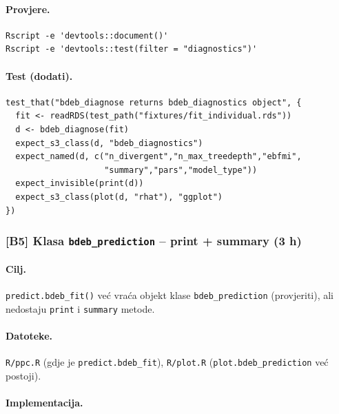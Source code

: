 \documentclass[11pt,a4paper]{article}
\newcommand{\file}[1]{\texttt{\small #1}}
\newcommand{\fn}[1]{\texttt{\small #1()}}
\newcommand{\code}[1]{\texttt{\small #1}}
\begin{document}
\paragraph{Provjere.}
\begin{lstlisting}[style=Shellstyle]
Rscript -e 'devtools::document()'
Rscript -e 'devtools::test(filter = "diagnostics")'
\end{lstlisting}

\paragraph{Test (dodati).}
\begin{lstlisting}
test_that("bdeb_diagnose returns bdeb_diagnostics object", {
  fit <- readRDS(test_path("fixtures/fit_individual.rds"))
  d <- bdeb_diagnose(fit)
  expect_s3_class(d, "bdeb_diagnostics")
  expect_named(d, c("n_divergent","n_max_treedepth","ebfmi",
                    "summary","pars","model_type"))
  expect_invisible(print(d))
  expect_s3_class(plot(d, "rhat"), "ggplot")
})
\end{lstlisting}

\subsubsection*{[B5] Klasa \texttt{bdeb\_prediction} -- print + summary
(3 h)}

\paragraph{Cilj.} \fn{predict.bdeb\_fit} već vraća objekt klase
\code{bdeb\_prediction} (provjeriti), ali nedostaju \code{print} i
\code{summary} metode.

\paragraph{Datoteke.} \file{R/ppc.R} (gdje je
\code{predict.bdeb\_fit}), \file{R/plot.R} (\code{plot.bdeb\_prediction}
već postoji).

\paragraph{Implementacija.}
\end{document}
